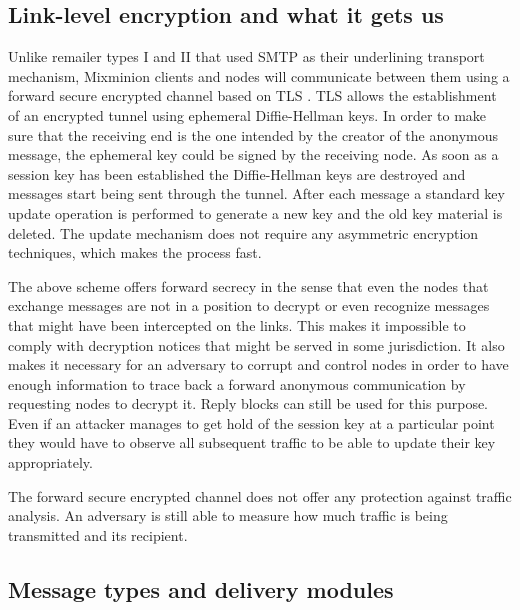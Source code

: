 \documentclass{llncs}
\begin{document}

\subsection{Link-level encryption and what it gets us}

Unlike remailer types I and II that used SMTP as their underlining 
transport mechanism, Mixminion clients and nodes will communicate between 
them using a forward secure encrypted channel based on TLS \cite{TLS}.
TLS allows the establishment of an encrypted tunnel using ephemeral 
Diffie-Hellman keys. In order to make sure that the receiving end is the 
one intended by the creator of the anonymous message, the ephemeral key could be 
signed by the receiving node. As soon as a session key has been established 
the Diffie-Hellman keys are destroyed and messages start being sent through the
tunnel. After each message a standard key update operation is performed to generate 
a new key and the old key material is deleted. The update mechanism does not require 
any asymmetric encryption techniques, which makes the process fast.

The above scheme offers forward secrecy in the sense that even the nodes 
that exchange messages are not in a position to decrypt or even recognize 
messages that might have been intercepted on the links. This makes it impossible 
to comply with decryption notices that might be served in some jurisdiction.
It also makes it necessary for an adversary to corrupt and control nodes in order
to have enough information to trace back a forward anonymous communication by 
requesting nodes to decrypt it. Reply blocks can still be used for this purpose.
Even if an attacker manages to get hold of the session key at a particular point
they would have to observe all subsequent traffic to be able to update their key
appropriately. 

The forward secure encrypted channel does not offer any protection against 
traffic analysis. An adversary is still able to measure how much traffic is 
being transmitted and its recipient.



\subsection{Message types and delivery modules}
\end{document}
